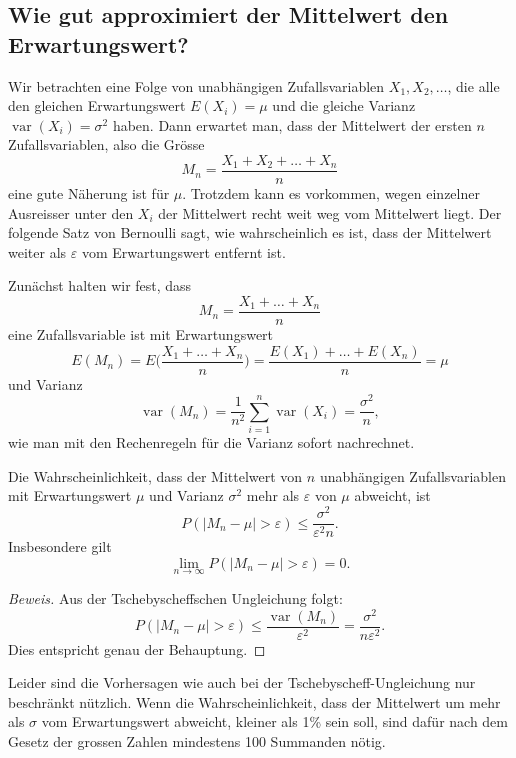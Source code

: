 \subsection{Wie gut approximiert der Mittelwert den Erwartungswert?} \label{approximation-mittelwert}
Wir betrachten eine Folge von unabhängigen Zufallsvariablen $X_1, X_2,\dots$, die
alle den gleichen Erwartungswert $E(X_i)=\mu$ und die gleiche Varianz
$\operatorname{var}(X_i)=\sigma^2$ haben.
Dann erwartet man, dass 
der Mittelwert der ersten $n$ Zufallsvariablen, also die
Grösse
\[
M_n=\frac{X_1+X_2+\dots+X_n}{n}
\]
eine gute Näherung ist für $\mu$. Trotzdem kann es vorkommen, wegen
einzelner Ausreisser unter den $X_i$ der Mittelwert recht weit weg
vom Mittelwert liegt.
Der folgende Satz von Bernoulli sagt, wie wahrscheinlich
es ist, dass der Mittelwert weiter als $\varepsilon$ vom Erwartungswert
entfernt ist.

Zunächst halten wir fest, dass
\[
M_n=\frac{X_1+\dots+X_n}{n}
\]
eine Zufallsvariable ist mit Erwartungswert
\[
E(M_n)=E\biggl(\frac{X_1+\dots+X_n}{n}\biggr)
=\frac{E(X_1)+\dots+E(X_n)}{n}=\mu
\]
und Varianz
\[
\operatorname{var}(M_n) =\frac1{n^2}\sum_{i=1}^n\operatorname{var}(X_i)
=\frac{\sigma^2}n,
\]
wie man mit den Rechenregeln für die Varianz sofort nachrechnet.

\begin{satz}
Die Wahrscheinlichkeit, dass der Mittelwert von $n$ unabhängigen Zufallsvariablen
mit Erwartungswert $\mu$ und Varianz $\sigma^2$ mehr als $\varepsilon$ von $\mu$
abweicht, ist
\[
P(|M_n-\mu|>\varepsilon)\le \frac{\sigma^2}{\varepsilon^2n}.
\]
Insbesondere gilt
\[
\lim_{n\to\infty}P(|M_n-\mu|>\varepsilon)=0.
\]
\end{satz}
\begin{proof}[Beweis]
Aus der Tschebyscheffschen Ungleichung folgt:
\[
P(|M_n-\mu|>\varepsilon)\le\frac{\operatorname{var}(M_n)}{\varepsilon^2}=
\frac{\sigma^2}{n\varepsilon^2}.
\]
Dies entspricht genau der Behauptung.
\end{proof}
Leider sind die Vorhersagen wie auch bei der Tschebyscheff-Ungleichung
nur beschränkt nützlich.
Wenn die Wahrscheinlichkeit, dass der Mittelwert
um mehr als $\sigma$ vom Erwartungswert abweicht, kleiner als 1\% sein
soll, sind dafür nach dem Gesetz der grossen Zahlen mindestens 100 Summanden
nötig.

